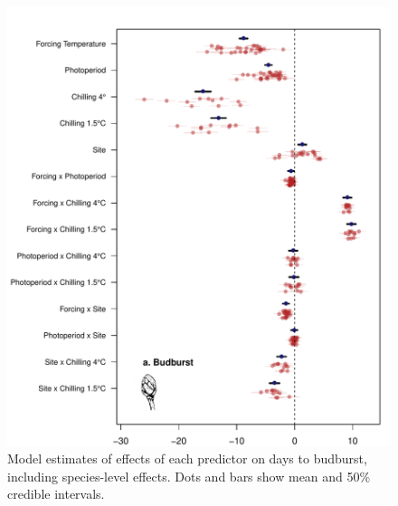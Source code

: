 \documentclass{article}
\begin{document}
\begin{figure}
\label{figS2}
\includegraphics[width=1\textwidth, page=1]{Fig1_bb_lo+sp} %
\caption{Model estimates of effects of each predictor on days to budburst, including species-level effects. Dots and bars show mean and 50\% credible intervals.}
\end{figure}

\clearpage
\end{document}
